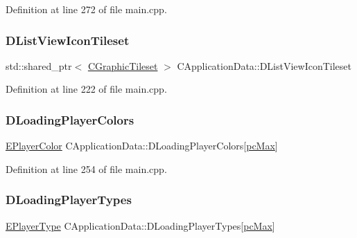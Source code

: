 Definition at line 272 of file main.\+cpp.

\hypertarget{classCApplicationData_ab00db57ca7c624d026ed1fc108bc5b38}{}\label{classCApplicationData_ab00db57ca7c624d026ed1fc108bc5b38} 
\subsubsection{\texorpdfstring{D\+List\+View\+Icon\+Tileset}{DListViewIconTileset}}
{\footnotesize\ttfamily std\+::shared\+\_\+ptr$<$ \hyperlink{classCGraphicTileset}{C\+Graphic\+Tileset} $>$ C\+Application\+Data\+::\+D\+List\+View\+Icon\+Tileset\hspace{0.3cm}{\ttfamily [protected]}}



Definition at line 222 of file main.\+cpp.

\hypertarget{classCApplicationData_ab29b80d90f1201608dcb498cd627a6f9}{}\label{classCApplicationData_ab29b80d90f1201608dcb498cd627a6f9} 
\subsubsection{\texorpdfstring{D\+Loading\+Player\+Colors}{DLoadingPlayerColors}}
{\footnotesize\ttfamily \hyperlink{GameDataTypes_8h_aafb0ca75933357ff28a6d7efbdd7602f}{E\+Player\+Color} C\+Application\+Data\+::\+D\+Loading\+Player\+Colors\mbox{[}\hyperlink{GameDataTypes_8h_aafb0ca75933357ff28a6d7efbdd7602fa594a5c8dd3987f24e8a0f23f1a72cd34}{pc\+Max}\mbox{]}\hspace{0.3cm}{\ttfamily [protected]}}



Definition at line 254 of file main.\+cpp.

\hypertarget{classCApplicationData_a2ac5711b027842d57aa5f8e5a7adc589}{}\label{classCApplicationData_a2ac5711b027842d57aa5f8e5a7adc589} 
\subsubsection{\texorpdfstring{D\+Loading\+Player\+Types}{DLoadingPlayerTypes}}
{\footnotesize\ttfamily \hyperlink{classCApplicationData_ae04b6b340297311972ce1e955196fcaa}{E\+Player\+Type} C\+Application\+Data\+::\+D\+Loading\+Player\+Types\mbox{[}\hyperlink{GameDataTypes_8h_aafb0ca75933357ff28a6d7efbdd7602fa594a5c8dd3987f24e8a0f23f1a72cd34}{pc\+Max}\mbox{]}\hspace{0.3cm}{\ttfamily [protected]}}



